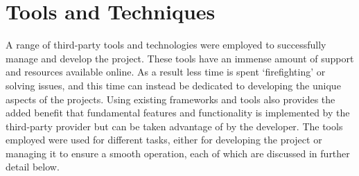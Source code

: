 \section{Tools and Techniques}
A range of third-party tools and technologies were employed to successfully manage and develop the project. These tools have an immense amount of support and resources available online. As a result less time is spent `firefighting' or solving issues, and this time can instead be dedicated to developing the unique aspects of the projects. Using existing frameworks and tools also provides the added benefit that fundamental features and functionality is implemented by the third-party provider but can be taken advantage of by the developer. The tools employed were used for different tasks, either for developing the project or managing it to ensure a smooth operation, each of which are discussed in further detail below.

